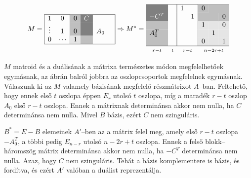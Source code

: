 \[ 
M=
\begin{array}{|cc|c|c|rc|}
\hline
1       &  0     & \multicolumn{1}{>{\columncolor{lightgray}}l}{\color{black}0} & \multicolumn{1}{>{\columncolor{gray}}l}{\color{white}C} &     &\\
\vdots &  1     & \multicolumn{1}{>{\columncolor{lightgray}}l}{\color{black}0} &  \multicolumn{1}{>{\columncolor{gray}}l}{\color{white}} & A_0 &\\
0       &  \cdots  & \multicolumn{1}{>{\columncolor{ColorGreyish}}l}{\color{black}1} &\multicolumn{1}{>{\columncolor{lightgray}}l}{\color{black}}   &     &\\
\hline
\end{array}
\Rightarrow
M^*=
\begin{array}{|c|c|cc|lcr|}
\hline
\multicolumn{1}{>{\columncolor{gray}}l}{\color{white}}        & & 1&  &\multicolumn{1}{>{\columncolor{lightgray}}l}{\color{black}0} & \multicolumn{2}{>{\columncolor{lightgray}}l}{\color{black}}  \\
\multicolumn{1}{>{\columncolor{gray}}l}{\color{white}-C^T}    & &  & 1&\multicolumn{2}{>{\columncolor{lightgray}}l}{\color{black}} &\multicolumn{1}{>{\columncolor{lightgray}}l}{\color{black}0}  \\
\cline{1-1} \cline{5-7}
\multicolumn{1}{>{\columncolor{lightgray}}l}{\color{black}}   & &  &  & \multicolumn{1}{>{\columncolor{ColorGreyish}}l}{\color{black}1} & \multicolumn{1}{>{\columncolor{ColorGreyish}}l}{\color{black}} &\multicolumn{1}{>{\columncolor{ColorGreyish}}l}{\color{black}0}  \\
\multicolumn{1}{>{\columncolor{lightgray}}l}{\color{black}A_0^T}     & &  && \multicolumn{1}{>{\columncolor{ColorGreyish}}l}{\color{black}}  & \multicolumn{1}{>{\columncolor{ColorGreyish}}l}{\color{black}1}   & \multicolumn{1}{>{\columncolor{ColorGreyish}}l}{\color{black}} \\
\multicolumn{1}{>{\columncolor{lightgray}}l}{\color{black}} & &  &  & \multicolumn{1}{>{\columncolor{ColorGreyish}}l}{\color{black}0}  & \multicolumn{1}{>{\columncolor{ColorGreyish}}l}{\color{black}}  & \multicolumn{1}{>{\columncolor{ColorGreyish}}l}{\color{black}1} \\ \hline
\multicolumn{1}{c}{\mathsmaller{r-t}} & \multicolumn{1}{c}{\mathsmaller{t}} & \multicolumn{2}{c}{\mathsmaller{r-t}} & \multicolumn{3}{c}{\mathsmaller{n-2r+t}}
\end{array} 
\]

$M$ matroid és a duálisának a mátrixa természetes módon megfelelhetőek
egymásnak, az ábrán balról jobbra az oszlopcsoportok megfelelnek egymásnak.
Válaszunk ki az $M$ valamely bázisának megfelelő részmátrixot $A$--ban.
Feltehető, hogy ennek első $t$ oszlopa éppen $E_r$ utolsó $t$ oszlopa, míg a
maradék $r-t$ oszlop $A_0$ első $r-t$ oszlopa. Ennek a mátrixnak determinánsa
akkor nem nulla, ha $C$ determinánsa nem nulla. Mivel $B$ bázis, ezért $C$ nem
szinguláris.

$B^*=E-B$ elemeinek $A'$--ben az a mátrix felel meg, amely első $r-t$ oszlopa
$-A_0^T$, a többi pedig $E_{n-r}$ utolsó $n-2r+t$ oszlopa. Ennek a felső
blokk--háromszög mátrix determinánsa akkor nem nulla, ha $-C^T$ determinánsa nem
nulla.  Azaz, hogy $C$ nem szinguláris. Tehát a bázis komplementere is bázis, és
fordítva, és ezért $A'$ valóban a duálist reprezentálja.
